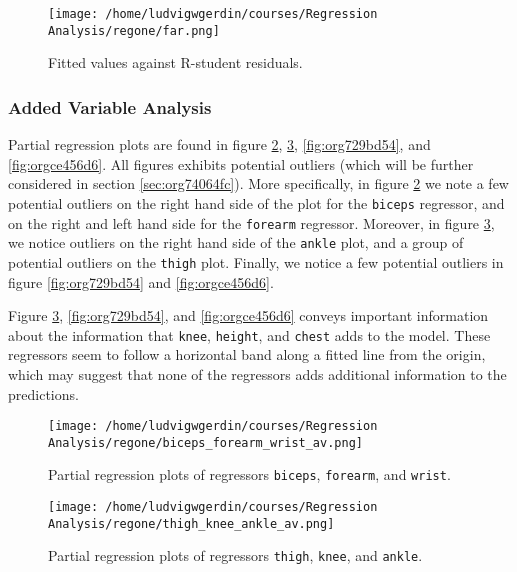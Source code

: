 \documentclass[11pt]{article}
\begin{document}
\begin{figure}[htbp]
\centering
\texttt{[image: /home/ludvigwgerdin/courses/Regression Analysis/regone/far.png]}
\caption{\label{fig:org61b26b9}
Fitted values against R-student residuals.}
\end{figure}

\subsubsection{Added Variable Analysis}
\label{sec:org75bc7d8}

Partial regression plots are found in figure \ref{fig:org33ad427}, \ref{fig:org6d66885},
\ref{fig:org729bd54}, and \ref{fig:orgce456d6}. All figures exhibits potential outliers 
(which will be further considered in section \ref{sec:org74064fc}).
More specifically, in figure \ref{fig:org33ad427} we note a 
few potential outliers on the right hand side of the plot for the \texttt{biceps} regressor, and on the
right and left hand side for the \texttt{forearm} regressor. Moreover, in figure \ref{fig:org6d66885}, we 
notice outliers on the right hand side of the \texttt{ankle} plot, and a group of potential outliers on the
\texttt{thigh} plot. Finally, we notice a few potential outliers in figure \ref{fig:org729bd54} and 
\ref{fig:orgce456d6}.

Figure \ref{fig:org6d66885}, \ref{fig:org729bd54}, and \ref{fig:orgce456d6} 
conveys important information about the information that \texttt{knee}, \texttt{height}, and
\texttt{chest} adds to the model. These regressors seem to follow a horizontal band along a fitted 
line from the origin, which may suggest that none of the regressors adds additional information 
to the predictions.

\begin{figure}[htbp]
\centering
\texttt{[image: /home/ludvigwgerdin/courses/Regression Analysis/regone/biceps\_forearm\_wrist\_av.png]}
\caption{\label{fig:org33ad427}
Partial regression plots of regressors \texttt{biceps}, \texttt{forearm}, and \texttt{wrist}.}
\end{figure}   

\begin{figure}[htbp]
\centering
\texttt{[image: /home/ludvigwgerdin/courses/Regression Analysis/regone/thigh\_knee\_ankle\_av.png]}
\caption{\label{fig:org6d66885}
Partial regression plots of regressors \texttt{thigh}, \texttt{knee}, and \texttt{ankle}.}
\end{figure}
\end{document}
